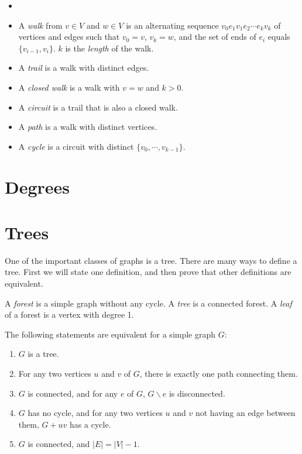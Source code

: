         \begin{defn} \label{def_graph_path} \begin{itemize}
            \item[]
            \item A \emph{walk} from $v \in V$ and $w \in V$ is an alternating sequence $v_0 e_1 v_1 e_2 \cdots e_k v_k$ of vertices and edges such that $v_0 = v$, $v_k = w$, and the set of ends of $e_i$ equals $\{v_{i-1}, v_i\}$. $k$ is the \emph{length} of the walk.
            \item A \emph{trail} is a walk with distinct edges.
            \item A \emph{closed walk} is a walk with $v=w$ and $k>0$.
            \item A \emph{circuit} is a trail that is also a closed walk.
            \item A \emph{path} is a walk with distinct vertices.
            \item A \emph{cycle} is a circuit with distinct $\{v_0, \cdots, v_{k-1}\}$.
        \end{itemize} \end{defn}
    
    \section{Degrees}
    
    \section{Trees}
        One of the important classes of graphs is a tree. There are many ways to define a tree. First we will state one definition, and then prove that other definitions are equivalent.
        \begin{defn}[Tree] \label{def_tree}
            A \emph{forest} is a simple graph without any cycle. A \emph{tree} is a connected forest. A \emph{leaf} of a forest is a vertex with degree 1.
        \end{defn}
        
        \begin{thm} \label{thm_tree}
            The following statements are equivalent for a simple graph $G$: \begin{enumerate}
                \item $G$ is a tree.
                \item For any two vertices $u$ and $v$ of $G$, there is exactly one path connecting them.
                \item $G$ is connected, and for any $e$ of $G$, $G \backslash e$ is disconnected.
                \item $G$ has no cycle, and for any two vertices $u$ and $v$ not having an edge between them, $G+uv$ has a cycle.
                \item $G$ is connected, and $|E| = |V|-1$.
            \end{enumerate}
        \end{thm}

